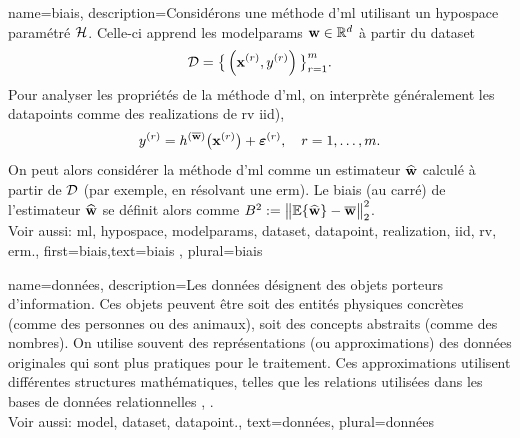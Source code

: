 {
	name={biais},
	description={Considérons une méthode d'\gls{ml} utilisant un \gls{hypospace} paramétré $\mathcal{H}$. 
		Celle-ci apprend les \glspl{modelparam} ${\bf w} \in \mathbb{R}^{d}$ à partir du \gls{dataset} 
		$$ \mathcal{D}=\big\{ \left( {\bf x}^{(r)},y^{(r)} \right) \big\}_{r=1}^{m}.$$ 
		Pour analyser les propriétés de la méthode d'\gls{ml}, on interprète généralement les \glspl{datapoint} comme des \glspl{realization} de
		\gls{rv} \gls{iid}), 
		$$ y^{(r)} = h^{(\overline{{\bf w}})}\big( {\bf x}^{(r)} \big) + \bm{\varepsilon}^{(r)}, \quad r=1,\ldots,m.$$ 
		On peut alors considérer la méthode d'\gls{ml} comme un estimateur $\widehat{{\bf w}}$ 
		calculé à partir de $\mathcal{D}$ (par exemple, en résolvant une \gls{erm}). Le biais (au carré) de l’estimateur $\widehat{{\bf w}}$ 
		se définit alors comme $B^{2} := \big\| \mathbb{E} \{ \widehat{{\bf w}}  \}- \overline{{\bf w}}\big\|_{2}^{2}$.
		\\ 
		Voir aussi: \gls{ml}, \gls{hypospace}, \glspl{modelparam}, \gls{dataset}, \gls{datapoint}, \gls{realization}, \gls{iid}, \gls{rv}, \gls{erm}.},
	first={biais},text={biais} , plural={biais}
}

{name={données},
	description={Les données désignent des objets porteurs d'information. Ces 
		objets peuvent être soit des entités physiques concrètes (comme des personnes ou des animaux), 
		soit des concepts abstraits (comme des nombres). On utilise souvent des représentations (ou 
		approximations) des données originales qui sont plus pratiques pour le traitement. 
		Ces approximations utilisent différentes structures mathématiques, telles que les relations 
		utilisées dans les bases de données relationnelles \cite{codd1970relational}, \cite{silberschatz2019database}.
		\\
		Voir aussi: \gls{model}, \gls{dataset}, \gls{datapoint}.}, 
	text={données}, plural={données}
}



